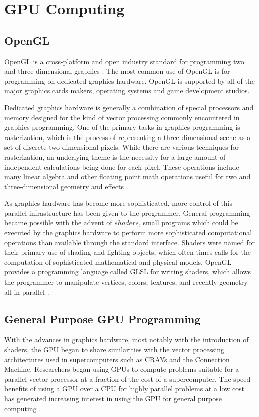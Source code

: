 \chapter{GPU Computing}

\section{OpenGL}
OpenGL is a cross-platform and open industry standard for programming two and
three dimensional graphics \cite{OpenGL}. The most common use of OpenGL is for
programming on dedicated graphics hardware. OpenGL is supported by all of the
major graphics cards makers, operating systems and game development studios.


Dedicated graphics hardware is generally a combination of special processors
and memory designed for the kind of vector processing commonly encountered in
graphics programming. One of the primary tasks in graphics programming is
rasterization, which is the process of representing a three-dimensional
scene as a set of discrete two-dimensional pixels. While there are various
techniques for rasterization, an underlying theme is the necessity for a large
amount of independent calculations being done for each pixel. These operations
include many linear algebra and other floating point math operations useful for
two and three-dimensional geometry and effects \cite{Luebke2007}.


As graphics hardware has become more sophisticated, more control of this
parallel infrastructure has been given to the programmer. General programming
became possible with the advent of $shaders$, small programs which could be
executed by the graphics hardware to perform more sophisticated computational
operations than available through the standard interface. Shaders were named
for their primary use of shading and lighting objects, which often times calls
for the computation of sophisticated mathematical and physical models. OpenGL
provides a programming language called GLSL for writing shaders, which allows
the programmer to manipulate vertices, colors, textures, and recently geometry
all in parallel \cite{Luebke2007}.


\section{General Purpose GPU Programming}


With the advances in graphics hardware, most notably with the introduction of
shaders, the GPU began to share similarities with the vector processing
architectures used in supercomputers such as CRAYs and the Connection Machine.
Researchers began using GPUs to compute problems suitable for a parallel vector
processor at a fraction of the cost of a supercomputer. The speed benefits of
using a GPU over a CPU for highly parallel problems at a low cost has generated
increasing interest in using the GPU for general purpose
computing \cite{Owens2007}.


